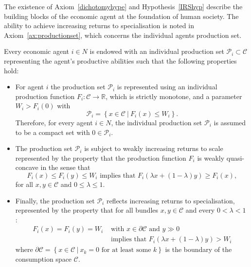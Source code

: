 The existence of Axiom~\ref{dichotomyhype} and Hypothesis~\ref{IRShyp} describe the building blocks of the economic agent at the foundation of human society. The ability to achieve increasing returns to specialisation is noted in Axiom~\ref{ax:productionset}, which concerns the individual agents production set.

\begin{axiom} \label{ax:productionset}
Every economic agent $i \in N$ is endowed with an individual production set $\mathcal{P}_{i} \subset \mathcal{C}$ representing the agent's productive abilities such that the following properties hold:
\begin{itemize}
\item For agent $i$ the production set $\mathcal{P}_{i}$ is represented using an individual production function $F_{i} \colon \mathcal{C} \rightarrow \mathbb{R}$, which is strictly monotone, and a parameter $W_{i} > F_{i}(0)$ with
\begin{equation}
\mathcal{P}_{i} = \left\{ x \in \mathcal{C} ~ | ~ F_{i}(x) \leqslant W_{i} \right\} .
\end{equation}
Therefore, for every agent $i \in N$, the individual production set $\mathcal{P}_{i}$ is assumed to be a compact set with $0 \in \mathcal{P}_{i}$.

\item The production set $\mathcal{P}_{i}$ is subject to weakly increasing returns to scale represented by the property that the production function $F_{i}$ is weakly quasi-concave in the sense that
\begin{equation}
F_{i}(x) \leqslant F_{i}(y) \leqslant W_{i} \mbox{ implies that } F_{i}( \lambda x + (1 - \lambda) y) \geqslant F_{i}(x) ,
\end{equation}
for all $x,y \in \mathcal{C}$ and $0 \leqslant \lambda \leqslant 1$.

\item Finally, the production set $\mathcal{P}_{i}$ reflects increasing returns to specialisation, represented by the property that for all bundles $x,y \in \mathcal{C}$ and every $0 < \lambda < 1$ :
\begin{align*}
F_{i}(x) = F_{i}(y) = W_{i} &\mbox{ with } x \in \partial \mathcal{C} \mbox{ and } y \gg 0 \\
&\mbox{ implies that } F_{i}( \lambda x + (1 - \lambda) y) > W_{i}
\end{align*}
where $\partial \mathcal{C} = \left\{ x \in \mathcal{C} ~ | ~ x_{k} = 0 \mbox{ for at least some } k \right\}$ is the boundary of the consumption space $\mathcal{C}$.
\end{itemize}
\end{axiom}

